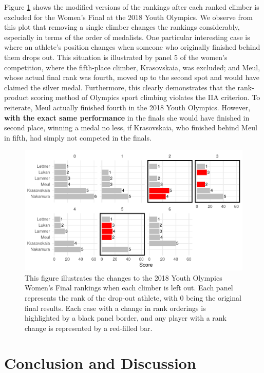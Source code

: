 \documentclass[letterpaper, inpress]{jds} %
\begin{document}
Figure \ref{fig:fig6} shows the modified versions of the rankings after
each ranked climber is excluded for the Women's Final at the 2018 Youth
Olympics. We observe from this plot that removing a single climber
changes the rankings considerably, especially in terms of the order of
medalists. One particular interesting case is where an athlete's
position changes when someone who originally finished behind them drops
out. This situation is illustrated by panel 5 of the women's
competition, where the fifth-place climber, Krasovskaia, was excluded;
and Meul, whose actual final rank was fourth, moved up to the second
spot and would have claimed the silver medal. Furthermore, this clearly
demonstrates that the rank-product scoring method of Olympics sport
climbing violates the IIA criterion. To reiterate, Meul actually
finished fourth in the 2018 Youth Olympics. However, \textbf{with the
exact same performance} in the finals she would have finished in second
place, winning a medal no less, if Krasovskaia, who finished behind Meul
in fifth, had simply not competed in the finals.

\begin{figure}
\centering
\includegraphics[width=0.9\linewidth]{iia-1.pdf}
\caption{\label{fig:fig6}This figure illustrates the changes to the 2018
Youth Olympics Women's Final rankings when each climber is left out.
Each panel represents the rank of the drop-out athlete, with 0 being the
original final results. Each case with a change in rank orderings is
highlighted by a black panel border, and any player with a rank change
is represented by a red-filled bar.}
\end{figure}

\section{Conclusion and Discussion}
\label{sec:sec4}
\end{document}
